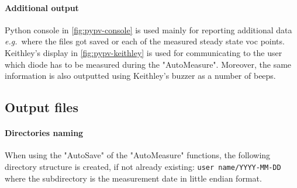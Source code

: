 		\begin{figure}
		\end{figure}

		\paragraph{Additional output}
		Python console in \cref{fig:pypv-console} is used mainly for reporting additional data \textsl{e.g.}\ where the files got saved or each of the measured steady state \gls{voc} points.
		Keithley's display in \cref{fig:pypv-keithley} is used for communicating to the user which diode has to be measured during the "AutoMeasure".
		Moreover, the same information is also outputted using Keithley's buzzer as a number of beeps.

	\subsection{Output files}

		\paragraph{Directories naming}\label{pypv_naming_directories}
		When using the "AutoSave" of the "AutoMeasure" functions, the following directory structure is created, if not already existing: \texttt{user name\-/YYYY-MM-DD} where the subdirectory is the measurement date in little endian format.

